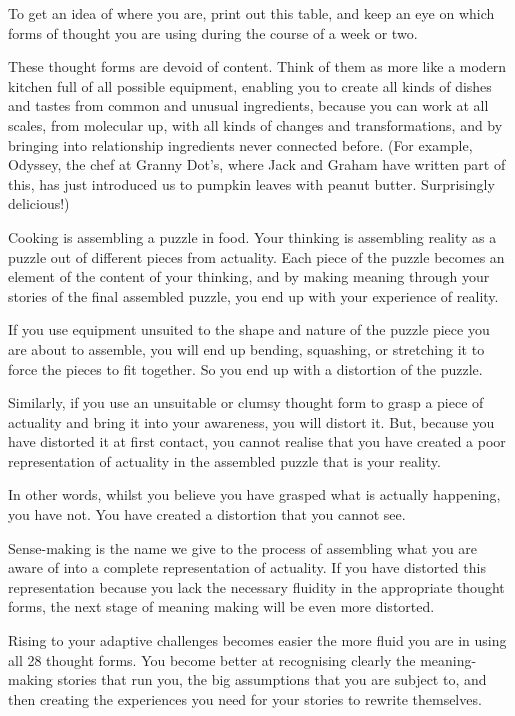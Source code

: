 To get an idea of where you are, print out this table, and keep an eye on which forms of thought you are using during the course of a week or two.


These thought forms are devoid of content. Think of them as more like a modern kitchen full of all possible equipment, enabling you to create all kinds of dishes and tastes from common and unusual ingredients, because you can work at all scales, from molecular up, with all kinds of changes and transformations, and by bringing into relationship ingredients never connected before. (For example, Odyssey, the chef at Granny Dot’s, where Jack and Graham have written part of this, has just introduced us to pumpkin leaves with peanut butter. Surprisingly delicious!)


Cooking is assembling a puzzle in food. Your thinking is assembling reality as a puzzle out of different pieces from actuality. Each piece of the puzzle becomes an element of the content of your thinking, and by making meaning through your stories of the final assembled puzzle, you end up with your experience of reality.


If you use equipment unsuited to the shape and nature of the puzzle piece you are about to assemble, you will end up bending, squashing, or stretching it to force the pieces to fit together. So you end up with a distortion of the puzzle.


Similarly, if you use an unsuitable or clumsy thought form to grasp a piece of actuality and bring it into your awareness, you will distort it. But, because you have distorted it at first contact, you cannot realise that you have created a poor representation of actuality in the assembled puzzle that is your reality. 


In other words, whilst you believe you have grasped what is actually happening, you have not. You have created a distortion that you cannot see.


Sense-making  is the name we give to the process of assembling what you are aware of into a complete representation of actuality. If you have distorted this representation because you lack the necessary fluidity in the appropriate thought forms, the next stage of meaning making will be even more distorted. 


Rising to your adaptive challenges  becomes easier the more fluid you are in using all 28 thought forms. You become better at recognising clearly the meaning-making stories that run you, the big assumptions that you are subject to, and then creating the experiences you need for your stories to rewrite themselves.


